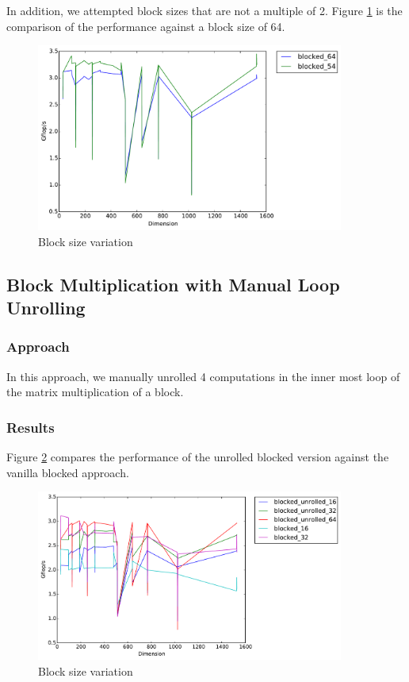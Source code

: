 \documentclass[11pt]{article}
\theoremstyle{plain}
\theoremstyle{definition}
\begin{document}
In addition, we attempted block sizes that are not a multiple of 2. Figure \ref{2} is the comparison of the performance against a block size of 64.\\
\begin{figure}[H]
    \includegraphics[width=0.9\textwidth]{timing_54_64.pdf}
    \caption{Block size variation}
    \label{2}
\end{figure} 


\subsection{Block Multiplication with Manual Loop Unrolling}
\subsubsection{Approach}
In this approach, we manually unrolled 4 computations in the inner most loop of the matrix multiplication of a block. 
\subsubsection{Results}
Figure \ref{3} compares the performance of the unrolled blocked version against the vanilla blocked approach.
\begin{figure}[H]
    \includegraphics[width=0.9\textwidth]{timing_unrolled_vs_nonunrolled.pdf}
    \caption{Block size variation}
    \label{3}
\end{figure} 
\end{document}
